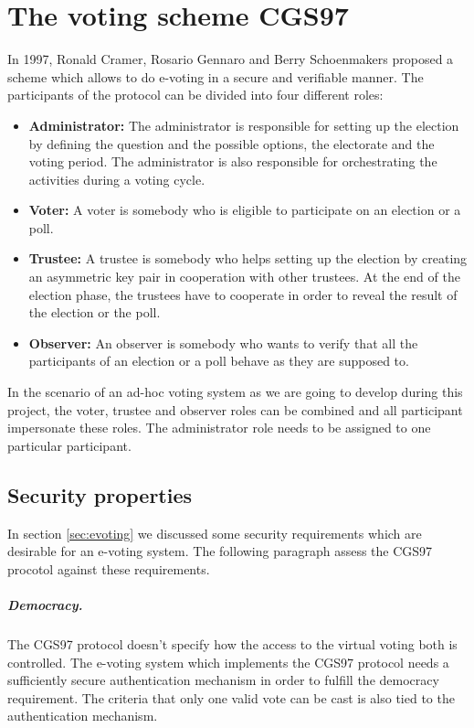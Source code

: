 \documentclass[numbers=noenddot, abstract=on, a4paper, headsepline,
footsepline, oneside, draft=off]{scrreprt}
\begin{document}
\section{The voting scheme CGS97}
\label{sec:CGS97}
In 1997, Ronald Cramer, Rosario Gennaro and Berry Schoenmakers proposed a scheme
\cite{CGS97} which allows to do e-voting in a secure and verifiable manner. The participants of
the protocol can be divided into four different roles:
\begin{itemize}
  \item \textbf{Administrator:} The administrator is responsible for setting up
  the election by defining the question and the possible options, the
  electorate and the voting period. The administrator is also responsible for
  orchestrating the activities during a voting cycle.
  \item \textbf{Voter:} A voter is somebody who is eligible to participate on
  an election or a poll. 
  \item \textbf{Trustee:} A trustee is somebody who helps setting up the
  election by creating an asymmetric key pair in cooperation with other
  trustees.
  At the end of the election phase, the trustees have to cooperate in order to
  reveal the result of the election or the poll.
  \item \textbf{Observer:} An observer is somebody who wants to verify that all
  the participants of an election or a poll behave as they are supposed to.
\end{itemize}

In the scenario of an ad-hoc voting system as we are going to develop during
this project, the voter, trustee and observer roles can be combined and all
participant impersonate these roles. The administrator role needs to be assigned
to one particular participant.

\subsection{Security properties}
\label{sec:secproperties}
In section \vref{sec:evoting} we discussed some security requirements which
are desirable for an e-voting system. The following paragraph assess the CGS97
procotol against these requirements.

\subparagraph{Democracy.} The CGS97 protocol doesn't specify how the access to
the virtual voting both is controlled. The e-voting system which implements the
CGS97 protocol needs a sufficiently secure authentication mechanism in order to
fulfill the democracy requirement. The criteria that only one valid vote can be
cast is also tied to the authentication mechanism.
\end{document}
